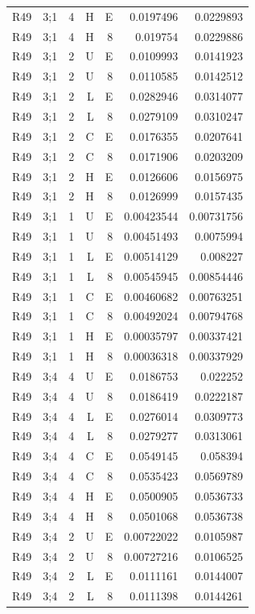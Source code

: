 {\begin{longtable}{@{}llrrrrr@{}}
R49 & 3;1 & 4 & H & E & 0.0197496 & 0.0229893 \\
R49 & 3;1 & 4 & H & 8 & 0.019754 & 0.0229886 \\
R49 & 3;1 & 2 & U & E & 0.0109993 & 0.0141923 \\
R49 & 3;1 & 2 & U & 8 & 0.0110585 & 0.0142512 \\
R49 & 3;1 & 2 & L & E & 0.0282946 & 0.0314077 \\
R49 & 3;1 & 2 & L & 8 & 0.0279109 & 0.0310247 \\
R49 & 3;1 & 2 & C & E & 0.0176355 & 0.0207641 \\
R49 & 3;1 & 2 & C & 8 & 0.0171906 & 0.0203209 \\
R49 & 3;1 & 2 & H & E & 0.0126606 & 0.0156975 \\
R49 & 3;1 & 2 & H & 8 & 0.0126999 & 0.0157435 \\
R49 & 3;1 & 1 & U & E & 0.00423544 & 0.00731756 \\
R49 & 3;1 & 1 & U & 8 & 0.00451493 & 0.0075994 \\
R49 & 3;1 & 1 & L & E & 0.00514129 & 0.008227 \\
R49 & 3;1 & 1 & L & 8 & 0.00545945 & 0.00854446 \\
R49 & 3;1 & 1 & C & E & 0.00460682 & 0.00763251 \\
R49 & 3;1 & 1 & C & 8 & 0.00492024 & 0.00794768 \\
R49 & 3;1 & 1 & H & E & 0.00035797 & 0.00337421 \\
R49 & 3;1 & 1 & H & 8 & 0.00036318 & 0.00337929 \\
R49 & 3;4 & 4 & U & E & 0.0186753 & 0.022252 \\
R49 & 3;4 & 4 & U & 8 & 0.0186419 & 0.0222187 \\
R49 & 3;4 & 4 & L & E & 0.0276014 & 0.0309773 \\
R49 & 3;4 & 4 & L & 8 & 0.0279277 & 0.0313061 \\
R49 & 3;4 & 4 & C & E & 0.0549145 & 0.058394 \\
R49 & 3;4 & 4 & C & 8 & 0.0535423 & 0.0569789 \\
R49 & 3;4 & 4 & H & E & 0.0500905 & 0.0536733 \\
R49 & 3;4 & 4 & H & 8 & 0.0501068 & 0.0536738 \\
R49 & 3;4 & 2 & U & E & 0.00722022 & 0.0105987 \\
R49 & 3;4 & 2 & U & 8 & 0.00727216 & 0.0106525 \\
R49 & 3;4 & 2 & L & E & 0.0111161 & 0.0144007 \\
R49 & 3;4 & 2 & L & 8 & 0.0111398 & 0.0144261 \\

\end{longtable}}
